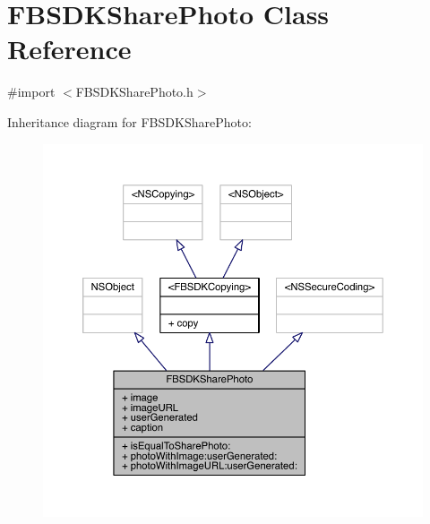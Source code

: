\hypertarget{interface_f_b_s_d_k_share_photo}{\section{F\-B\-S\-D\-K\-Share\-Photo Class Reference}
\label{interface_f_b_s_d_k_share_photo}
}


{\ttfamily \#import $<$F\-B\-S\-D\-K\-Share\-Photo.\-h$>$}



Inheritance diagram for F\-B\-S\-D\-K\-Share\-Photo\-:
\nopagebreak
\begin{figure}[H]
\begin{center}
\leavevmode
\includegraphics[width=350pt]{interface_f_b_s_d_k_share_photo__inherit__graph}
\end{center}
\end{figure}


